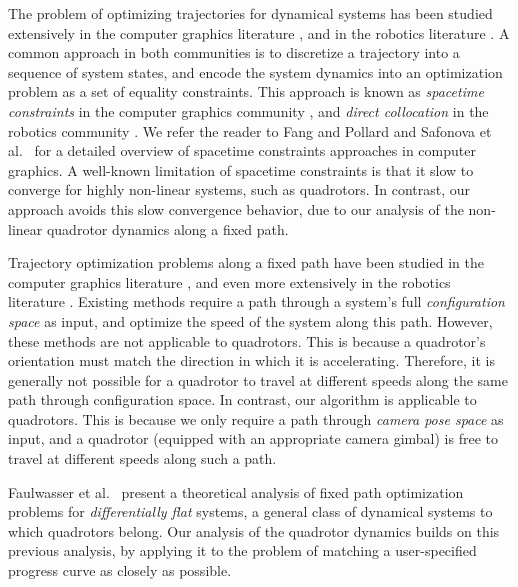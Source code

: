 The problem of optimizing trajectories for dynamical systems has been studied extensively in the computer  graphics literature \cite{geijtenbeek:2012}, and in the robotics literature \cite{betts:1998}.
A common approach in both communities is to discretize a trajectory into a sequence of system states, and encode the system dynamics into an optimization problem as a set of equality constraints.
This approach is known as \emph{spacetime constraints} in the computer graphics community \cite{witkins:1988}, and \emph{direct collocation} in the robotics community \cite{betts:1998}.
We refer the reader to Fang and Pollard  and Safonova et al.~ for a detailed overview of spacetime constraints approaches in computer graphics.
A well-known limitation of spacetime constraints is that it slow to converge for highly non-linear systems, such as quadrotors.
In contrast, our approach avoids this slow convergence behavior, due to our analysis of the non-linear quadrotor dynamics along a fixed path.

Trajectory optimization problems along a fixed path have been studied in the computer graphics literature \cite{mccann:2006}, and even more extensively in the robotics literature \cite{shin:1985,slotine:1989,dahl:1990,verscheure:2009,lipp:2014}.
Existing methods require a path through a system's full \emph{configuration space} as input, and optimize the speed of the system along this path.
However, these methods are not applicable to quadrotors.
This is because a quadrotor's orientation must match the direction in which it is accelerating.
Therefore, it is generally not possible for a quadrotor to travel at different speeds along the same path through configuration space.
In contrast, our algorithm is applicable to quadrotors.
This is because we only require a path through \emph{camera pose space} as input, and a quadrotor (equipped with an appropriate camera gimbal) is free to travel at different speeds along such a path.

Faulwasser et al.~ present a theoretical analysis of fixed path optimization problems for \emph{differentially flat} systems, a general class of dynamical systems to which quadrotors belong.
Our analysis of the quadrotor dynamics builds on this previous analysis, by applying it to the problem of matching a user-specified progress curve as closely as possible.       
